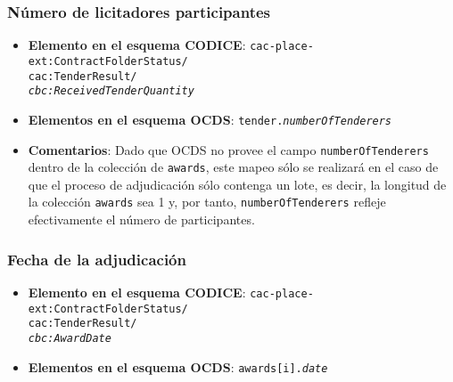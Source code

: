         \subsubsection{Número de licitadores participantes}
            \begin{itemize}
                \item \textbf{Elemento en el esquema CODICE}:
                    \tabto{7.6cm} \texttt{cac-place-ext:ContractFolderStatus/} \\
                    \tabto{7.6cm} \texttt{cac:TenderResult/} \\
                    \tabto{7.6cm} \texttt{\textit{cbc:ReceivedTenderQuantity}}
                \item \textbf{Elementos en el esquema OCDS}:
                    \tabto{7.6cm} \texttt{tender.\textit{numberOfTenderers}}
                \item \textbf{Comentarios}: Dado que OCDS no provee el campo \texttt{numberOfTenderers} dentro de la colección de \texttt{awards}, este mapeo sólo se realizará en el caso de que el proceso de adjudicación sólo contenga un lote, es decir, la longitud de la colección \texttt{awards} sea 1 y, por tanto, \texttt{numberOfTenderers} refleje efectivamente el número de participantes.
            \end{itemize}
            
        \subsubsection{Fecha de la adjudicación}
            \begin{itemize}
                \item \textbf{Elemento en el esquema CODICE}:
                    \tabto{7.6cm} \texttt{cac-place-ext:ContractFolderStatus/} \\
                    \tabto{7.6cm} \texttt{cac:TenderResult/} \\
                    \tabto{7.6cm} \texttt{\textit{cbc:AwardDate}}
                \item \textbf{Elementos en el esquema OCDS}:
                    \tabto{7.6cm} \texttt{awards[i].\textit{date}}
            \end{itemize}
            
